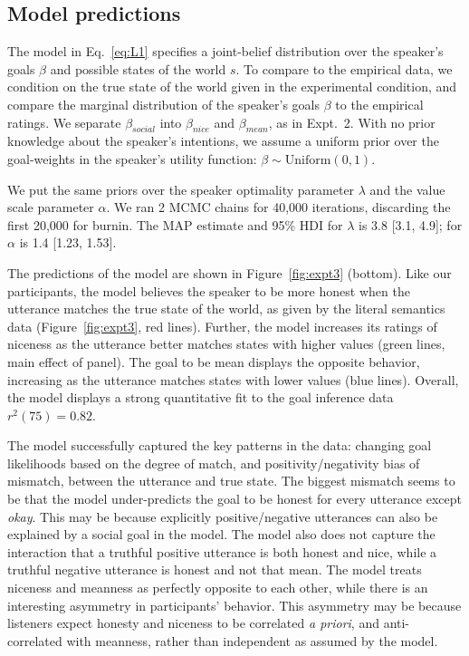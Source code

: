 \documentclass[10pt,letterpaper]{article}
\begin{document}
\subsection{Model predictions}

The model in Eq.~\ref{eq:L1} specifies a joint-belief distribution over the speaker's goals $\beta$ and possible states of the world $s$.
To compare to the empirical data, we condition on the true state of the world given in the experimental condition, and compare the marginal distribution of the speaker's goals $\beta$ to the empirical ratings.
We separate $\beta_{social}$ into  $\beta_{nice}$ and  $\beta_{mean}$, as in Expt.~2.
With no prior knowledge about the speaker's intentions, we assume a uniform prior over the goal-weights in the speaker's utility function: $\beta \sim \text{Uniform}(0,1)$.

We put the same priors over the speaker optimality parameter $\lambda$ and the value scale parameter $\alpha$.
We ran 2 MCMC chains for 40,000 iterations, discarding the first 20,000 for burnin.
The MAP estimate and 95\% HDI for $\lambda$ is 3.8 [3.1, 4.9]; for $\alpha$ is 1.4 [1.23, 1.53].%


The predictions of the model are shown in Figure~\ref{fig:expt3} (bottom).
Like our participants, the model believes the speaker to be more honest when the utterance matches the true state of the world, as given by the literal semantics data (Figure~\ref{fig:expt3}, red lines).
Further, the model increases its ratings of niceness as the utterance better matches states with higher values (green lines, main effect of panel).
The goal to be mean displays the opposite behavior, increasing as the utterance matches states with lower values (blue lines).
Overall, the model displays a strong quantitative fit to the goal inference data $r^2(75) = 0.82$.

The model successfully captured the key patterns in the data:
changing goal likelihoods based on the degree of match, and positivity/negativity bias of mismatch, between the utterance and true state.
The biggest mismatch seems to be that the model under-predicts the goal to be honest for every utterance except \emph{okay}.
This may be because explicitly positive/negative utterances can also be explained by a social goal in the model.
The model also does not capture the interaction that a truthful positive utterance is both honest and nice, while a truthful negative utterance is honest and not that mean.
 The model treats niceness and meanness as perfectly opposite to each other, while there is an interesting asymmetry in participants' behavior. 
This asymmetry may be because listeners expect honesty and niceness to be correlated \emph{a priori}, and anti-correlated with meanness, rather than independent as assumed by the model.
\end{document}
